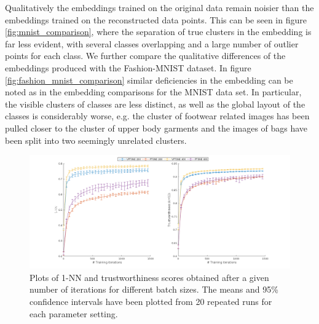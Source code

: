 Qualitatively the embeddings trained on the original data remain noisier than the embeddings trained on the reconstructed data points. This can be seen in figure \ref{fig:mnist_comparison}, where the separation of true clusters in the embedding is far less evident, with several classes overlapping and a large number of outlier points for each class. We further compare the qualitative differences of the embeddings produced with the Fashion-MNIST dataset. In figure \ref{fig:fashion_mnist_comparison} similar deficiencies in the embedding can be noted as in the embedding comparisons for the MNIST data set. In particular, the visible clusters of classes are less distinct, as well as the global layout of the classes is considerably worse, e.g. the cluster of footwear related images has been pulled closer to the cluster of upper body garments and the images of bags have been split into two seemingly unrelated clusters.

\begin{figure}[!htb]
  \centering
  \includegraphics[width=\textwidth]{images/learning_curves.png}
  \caption{Plots of 1-NN and trustworthiness scores obtained after a given number of iterations for different batch sizes. The means and 95\% confidence intervals have been plotted from 20 repeated runs for each parameter setting.}
  \label{fig:mnist_knn_trustworthiness}
\end{figure}


